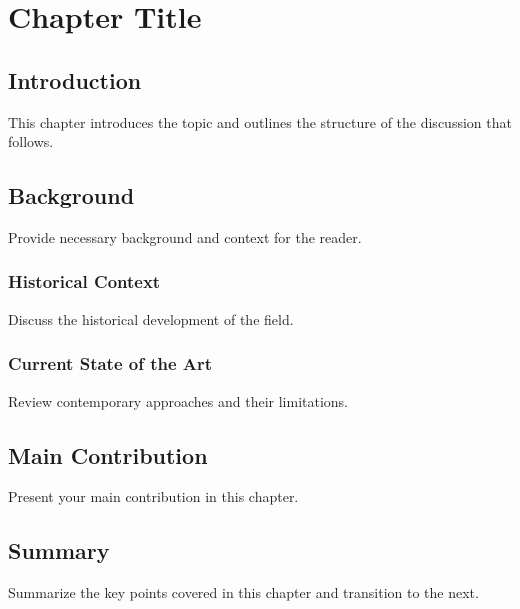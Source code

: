 \documentclass[12pt,a4paper,oneside]{report}
\begin{document}
\chapter{Chapter Title}

\section{Introduction}

This chapter introduces the topic and outlines the structure of the discussion that follows.

\section{Background}

Provide necessary background and context for the reader.

\subsection{Historical Context}

Discuss the historical development of the field.

\subsection{Current State of the Art}

Review contemporary approaches and their limitations.

\section{Main Contribution}

Present your main contribution in this chapter.

\section{Summary}

Summarize the key points covered in this chapter and transition to the next.
\end{document}
